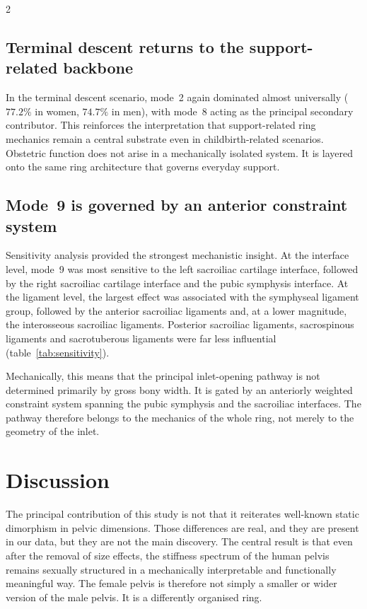 \documentclass[openacc]{rsproca_new}
\begin{document}
\begin{multicols}{2}
\subsection{Terminal descent returns to the support-related backbone}

In the terminal descent scenario, mode~2 again dominated almost universally ($77.2\%$ in women, $74.7\%$ in men), with mode~8 acting as the principal secondary contributor. This reinforces the interpretation that support-related ring mechanics remain a central substrate even in childbirth-related scenarios. Obstetric function does not arise in a mechanically isolated system. It is layered onto the same ring architecture that governs everyday support.

\subsection{Mode~9 is governed by an anterior constraint system}

Sensitivity analysis provided the strongest mechanistic insight. At the interface level, mode~9 was most sensitive to the left sacroiliac cartilage interface, followed by the right sacroiliac cartilage interface and the pubic symphysis interface. At the ligament level, the largest effect was associated with the symphyseal ligament group, followed by the anterior sacroiliac ligaments and, at a lower magnitude, the interosseous sacroiliac ligaments. Posterior sacroiliac ligaments, sacrospinous ligaments and sacrotuberous ligaments were far less influential (table~\ref{tab:sensitivity}).

Mechanically, this means that the principal inlet-opening pathway is not determined primarily by gross bony width. It is gated by an anteriorly weighted constraint system spanning the pubic symphysis and the sacroiliac interfaces. The pathway therefore belongs to the mechanics of the whole ring, not merely to the geometry of the inlet.

\section{Discussion}

The principal contribution of this study is not that it reiterates well-known static dimorphism in pelvic dimensions. Those differences are real, and they are present in our data, but they are not the main discovery. The central result is that even after the removal of size effects, the stiffness spectrum of the human pelvis remains sexually structured in a mechanically interpretable and functionally meaningful way. The female pelvis is therefore not simply a smaller or wider version of the male pelvis. It is a differently organised ring.


\end{multicols}
\end{document}
